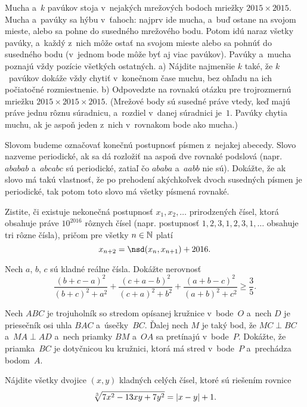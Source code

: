 {%
Mucha a~$k$ pavúkov stoja v~nejakých mrežových bodoch mriežky $2015 \times 2015$. Mucha a~pavúky sa hýbu v~ťahoch: najprv ide mucha, a~buď ostane na svojom mieste, alebo sa pohne do susedného mrežového bodu. Potom idú naraz všetky pavúky, a~každý z~nich môže ostať na svojom mieste alebo sa pohnúť do susedného bodu (v~jednom bode môže byť aj viac pavúkov). Pavúky a~mucha poznajú vždy pozície všetkých ostatných.
\ite a) Nájdite najmenšie $k$ také, že $k$~pavúkov dokáže vždy chytiť v~konečnom čase muchu, bez ohľadu na ich počiatočné rozmiestnenie.
\ite b) Odpovedzte na rovnakú otázku pre trojrozmernú mriežku $2015\times 2015\times 2015$.\endgraf
\noindent
(Mrežové body sú susedné práve vtedy, keď majú práve jednu rôznu súradnicu, a~rozdiel v~danej súradnici je~$1$. Pavúky chytia muchu, ak je aspoň jeden z~nich v~rovnakom bode ako mucha.)}

{%
Slovom budeme označovať konečnú postupnosť písmen z~nejakej abecedy. Slovo nazveme periodické, ak sa dá rozložiť na aspoň dve rovnaké podslová (napr. $ababab$ a~$abcabc$ sú periodické, zatiaľ čo $ababa$ a~$aabb$ nie sú). Dokážte, že ak slovo má takú vlastnosť, že po prehodení akýchkoľvek dvoch susedných písmen je periodické, tak potom toto slovo má všetky písmená rovnaké.}

{%
Zistite, či existuje nekonečná postupnosť $x_1,x_2,\dots$ prirodzených čísel, ktorá obsahuje práve $10^{2016}$ rôznych čísel (napr. postupnosť $1, 2, 3, 1, 2, 3, 1, \dots$ obsahuje tri rôzne čísla), pričom pre všetky $n\in\Bbb N$ platí
$$
x_{n+2} = \nsd(x_n,x_{n+1}) + 2016.
$$
}

{%
Nech $a$, $b$, $c$ sú kladné reálne čísla. Dokážte nerovnosť
$$
\frac{(b+c-a)^2}{(b+c)^2+a^2} + \frac{(c+a-b)^2}{(c+a)^2+b^2} + \frac{(a+b-c)^2}{(a+b)^2+c^2}\ge\frac35.
$$}

{%
Nech $ABC$ je trojuholník so stredom opísanej kružnice v~bode~$O$ a~nech $D$ je priesečník osi uhla $BAC$ a~úsečky~$BC$. Ďalej nech $M$ je taký bod, že $MC\perp BC$ a~$MA\perp AD$ a~nech priamky $BM$ a~$OA$ sa pretínajú v~bode~$P$. Dokážte, že priamka~$BC$ je dotyčnicou ku kružnici, ktorá má stred v~bode~$P$ a~prechádza bodom~$A$.}

{%
Nájdite všetky dvojice $(x,y)$ kladných celých čísel, ktoré sú riešením rovnice
$$
\root3\of{7x^2-13xy+7y^2}=|x-y|+1.
$$
}

